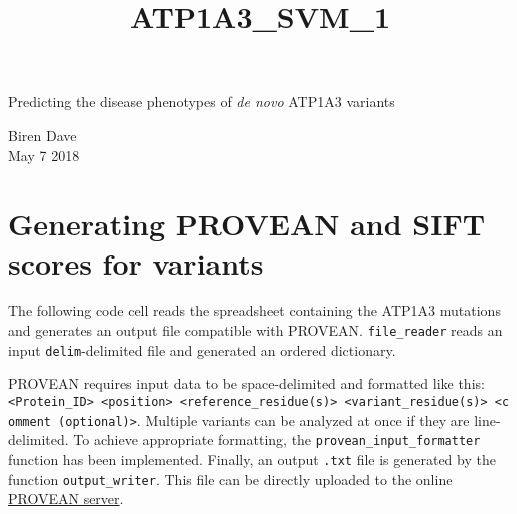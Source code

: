 \documentclass[11pt]{article}
\title{ATP1A3\_SVM\_1}
\begin{document}
    
    \begin{Huge}
    	\noindent
    	Predicting the disease phenotypes of \textit{de novo} ATP1A3 variants\\
    \end{Huge}
    
    
\begin{Large}
	\noindent
	Biren Dave\\
	May 7 2018
\end{Large}

\section{Generating PROVEAN and SIFT scores for
variants}\label{generating-provean-and-sift-scores-for-variants}

The following code cell reads the spreadsheet containing the ATP1A3
mutations and generates an output file compatible with PROVEAN.
\texttt{file\_reader} reads an input \texttt{delim}-delimited file and
generated an ordered dictionary.

PROVEAN requires input data to be space-delimited and formatted like
this:
\texttt{\textless{}Protein\_ID\textgreater{}\ \textless{}position\textgreater{}\ \textless{}reference\_residue(s)\textgreater{}\ \textless{}variant\_residue(s)\textgreater{}\ \textless{}comment\ (optional)\textgreater{}}.
Multiple variants can be analyzed at once if they are line-delimited. To
achieve appropriate formatting, the \texttt{provean\_input\_formatter}
function has been implemented. Finally, an output \texttt{.txt} file is
generated by the function \texttt{output\_writer}. This file can be
directly uploaded to the online
\href{http://provean.jcvi.org/protein_batch_submit.php?species=human}{PROVEAN
server}.
\end{document}
